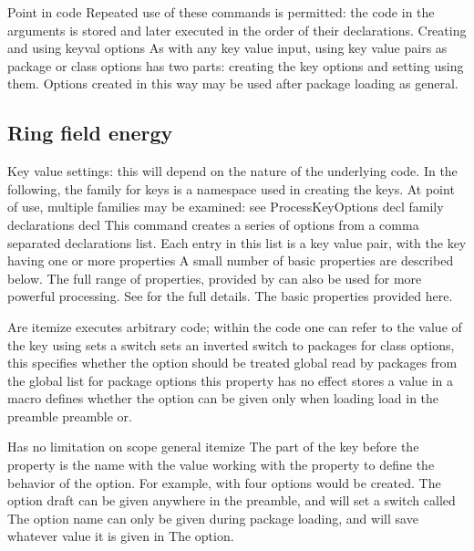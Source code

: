 \documentclass{article}
\begin{document}
Point in code Repeated use of these commands is permitted: the code in the arguments is stored and later executed in the order of their declarations. Creating and using keyval options As with any key value input, using key value pairs as package or class options has two parts: creating the key options and setting using them. Options created in this way may be used after package loading as general.

\subsection{Ring field energy}
Key value settings: this will depend on the nature of the underlying code. In the following, the family for keys is a namespace used in creating the keys. At point of use, multiple families may be examined: see ProcessKeyOptions decl family declarations decl This command creates a series of options from a comma separated declarations list. Each entry in this list is a key value pair, with the key having one or more properties A small number of basic properties are described below. The full range of properties, provided by can also be used for more powerful processing. See for the full details. The basic properties provided here.

Are itemize executes arbitrary code; within the code one can refer to the value of the key using sets a switch sets an inverted switch to packages for class options, this specifies whether the option should be treated global read by packages from the global list for package options this property has no effect stores a value in a macro defines whether the option can be given only when loading load in the preamble preamble or.

Has no limitation on scope general itemize The part of the key before the property is the name with the value working with the property to define the behavior of the option. For example, with four options would be created. The option draft can be given anywhere in the preamble, and will set a switch called The option name can only be given during package loading, and will save whatever value it is given in The option.
\end{document}
